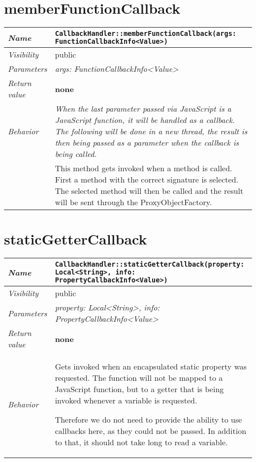  \section{memberFunctionCallback}
\begin{longtable}{p{3cm} @{\hskip 1cm} p{12cm}}
 \hline
\textit{Name} & \texttt{CallbackHandler::memberFunctionCallback(args: FunctionCallbackInfo<Value>)}\\
\hline
 \textit{Visibility} & public\\
\hline
\textit{Parameters} & \textit{args: FunctionCallbackInfo<Value>}\\
\hline
\textit{Return value} & \textbf{none}\\
  \hline
 \textit{Behavior} & \textit{When the last parameter passed via JavaScript is a JavaScript function, it will be handled as a callback. The following will be done in a new thread, the result is then being passed as a parameter when the callback is being called.}\\

 & This method gets invoked when a method is called. First a method with the correct signature is selected.
 The selected method will then be called and the result will be sent through the ProxyObjectFactory. \\
\hline
\end{longtable} \pagebreak
 \section{staticGetterCallback}
\begin{longtable}{p{3cm} @{\hskip 1cm} p{12cm}}
 \hline
\textit{Name} & \texttt{CallbackHandler::staticGetterCallback(property: Local<String>, info: PropertyCallbackInfo<Value>)}\\
\hline
 \textit{Visibility} & public\\
\hline
\textit{Parameters} & \textit{property: Local<String>, info: PropertyCallbackInfo<Value>}\\
\hline
\textit{Return value} & \textbf{none}\\
  \hline
 \textit{Behavior} &  Gets invoked when an encapsulated static property was requested. The function will not be mapped to a JavaScript function, but to a getter that is being invoked whenever a variable is requested.

 Therefore we do not need to provide the ability to use callbacks here, as they could not be passed. In addition to that, it should not take long to read a variable. \\
\hline
\end{longtable}
